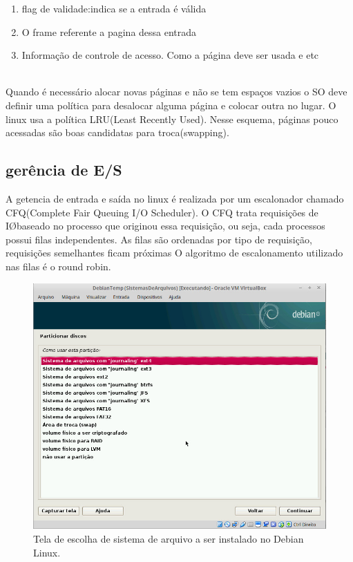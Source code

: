 \documentclass[conference]{IEEEtran}
\begin{document}
\begin{enumerate}
	\item flag de validade:indica se a entrada é válida
	\item O frame referente a pagina dessa entrada
	\item Informação de controle de acesso. Como a página deve ser usada e etc
\end{enumerate}
\cite{GerenciaMemLinux}
\\

Quando é necessário alocar novas páginas e não se tem espaços vazios o SO deve definir uma política para desalocar alguma página e colocar outra no lugar. O linux usa a política LRU(Least Recently Used). Nesse esquema, páginas pouco acessadas são boas candidatas para troca(swapping)\cite{GerenciaIOLinux}.

\subsection{gerência de E/S}\label{sec:LinuxES}
A getencia de entrada e saída no linux é realizada por um escalonador chamado CFQ(Complete Fair Queuing I/O Scheduler). O CFQ trata requisições de I\O baseado no processo que originou essa requisição, ou seja, cada processos possui filas independentes. As filas são ordenadas por tipo de requisição, requisições semelhantes ficam próximas O algoritmo de escalonamento utilizado nas filas é o round robin\cite{GerenciaIOLinux}.

\begin{figure}[h!]
	\centering
	\includegraphics[scale=0.3]{SistemasArquivosLinux.jpeg}
	\caption{Tela de escolha de sistema de arquivo a ser instalado no Debian Linux.}
	\label{fig:SisAqrLinux}
\end{figure}
\end{document}
